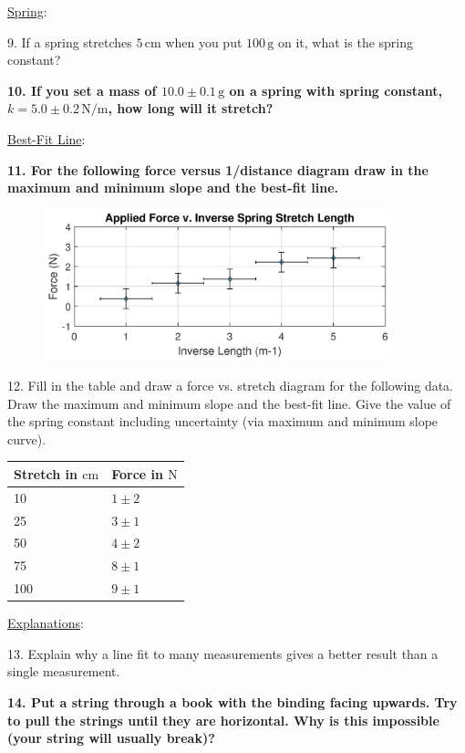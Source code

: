 \noindent \underline{Spring}:\myskip

9. If a spring stretches $5\,\mathrm{cm}$ when you put $100\,\mathrm{g}$ on it, what is the spring constant? \myskip

{\bf{10. If you set a mass of $10.0 \pm 0.1\,\mathrm{g}$ on a spring with spring constant, $k = 5.0 \pm 0.2 \,\mathrm{N/m}$, how long will it stretch?}} \myskip

\noindent \underline{Best-Fit Line}: \myskip

{\bf{11. For the following force versus 1/distance diagram draw in the maximum and minimum slope and the best-fit line.}}
\begin{figure}[h]
    \begin{center}
        \includegraphics[width=0.9\textwidth]{./Exp3/pic/image15.jpg}
    \end{center}
\end{figure}

12. Fill in the table and draw a force vs. stretch diagram for the following data. Draw the maximum and minimum slope and the best-fit line. Give the value of the spring constant including uncertainty (via maximum and minimum slope curve).
\begin{table}[h]
    \centering
    \begin{tabular}{|l|l|}
        \hline 
        Stretch in $\mathrm{cm}$ & Force in $\mathrm{N}$ \\ \hline
        10 & $1\pm 2$ \\ \hline
        25 & $3\pm 1$ \\ \hline
        50 & $4\pm 2$ \\ \hline
        75 & $8\pm 1$ \\ \hline
        100 & $9\pm 1$ \\ \hline
    \end{tabular}
\end{table}

\noindent \underline{Explanations}:\myskip

13. Explain why a line fit to many measurements gives a better result than a single measurement. \myskip

{\bf{14. Put a string through a book with the binding facing upwards. Try to pull the strings until they are horizontal.  Why is this impossible (your string will usually break)?}}



